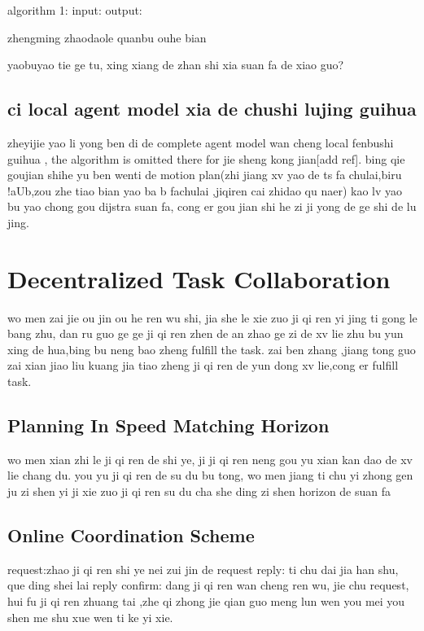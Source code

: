 \documentclass[journal]{IEEEtran}
\begin{document}
algorithm 1:
input:
output:



zhengming zhaodaole quanbu ouhe bian

yaobuyao tie ge tu, xing xiang de zhan shi xia suan fa de xiao guo?
\subsection{ci local agent model xia de chushi lujing guihua}
zheyijie yao li yong ben di de complete agent model wan cheng local fenbushi guihua , the algorithm is omitted there for jie sheng kong jian[add ref]. bing qie goujian shihe yu ben wenti de motion plan(zhi jiang xv yao de ts fa chulai,biru !aUb,zou zhe tiao bian yao ba b fachulai ,jiqiren cai zhidao qu naer) kao lv yao bu yao chong gou dijstra suan fa, cong er gou jian shi he zi ji yong de ge shi de lu jing.
\section{Decentralized Task Collaboration}
wo men zai jie ou jin ou he ren wu shi, jia she le xie zuo ji qi ren yi jing ti gong le bang zhu, dan ru guo ge ge ji qi ren zhen de an zhao ge zi de xv lie zhu bu yun xing de hua,bing bu neng bao zheng fulfill the task. zai ben zhang ,jiang tong guo zai xian jiao liu kuang jia tiao zheng ji qi ren de yun dong xv lie,cong er fulfill task.
\subsection{Planning In Speed Matching Horizon}
wo men xian zhi le ji qi ren de shi ye, ji ji qi ren neng gou yu xian kan dao de xv lie chang du. you yu ji qi ren de su du bu tong, wo men jiang ti chu yi zhong gen ju zi shen yi ji xie zuo ji qi ren su du cha she ding zi shen horizon de suan fa
\subsection{Online Coordination Scheme}
request:zhao ji qi ren shi ye nei zui jin de request
reply: ti chu dai jia han shu, que ding shei lai reply
confirm: dang ji qi ren wan cheng ren wu, jie chu request, hui fu ji qi ren zhuang tai ,zhe qi zhong jie qian guo meng lun wen you mei you shen me shu xue wen ti ke yi xie.
\end{document}
